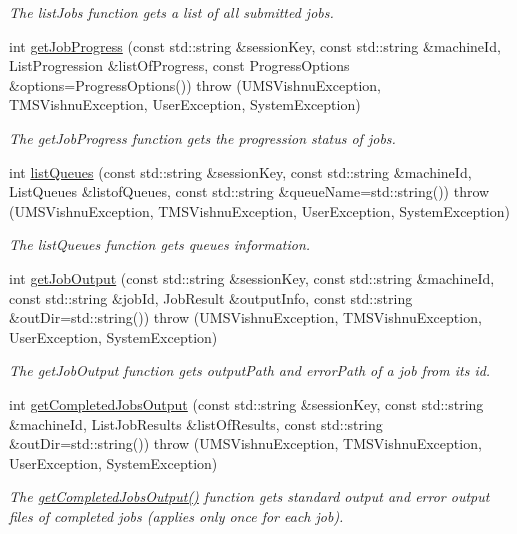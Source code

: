 \begin{DoxyCompactItemize}
\begin{DoxyCompactList}\small\item\em The listJobs function gets a list of all submitted jobs. \item\end{DoxyCompactList}\item 
int \hyperlink{namespacevishnu_a5bc51ba53a335079d0b7044cc2c8f4cc}{getJobProgress} (const std::string \&sessionKey, const std::string \&machineId, ListProgression \&listOfProgress, const ProgressOptions \&options=ProgressOptions())  throw (UMSVishnuException, TMSVishnuException, UserException, SystemException)
\begin{DoxyCompactList}\small\item\em The getJobProgress function gets the progression status of jobs. \item\end{DoxyCompactList}\item 
int \hyperlink{namespacevishnu_ada2d98155cffa475261261fb33f7e873}{listQueues} (const std::string \&sessionKey, const std::string \&machineId, ListQueues \&listofQueues, const std::string \&queueName=std::string())  throw (UMSVishnuException, TMSVishnuException, UserException, SystemException)
\begin{DoxyCompactList}\small\item\em The listQueues function gets queues information. \item\end{DoxyCompactList}\item 
int \hyperlink{namespacevishnu_a6e0b3df33a91bd16cdadf3ac428fcf0e}{getJobOutput} (const std::string \&sessionKey, const std::string \&machineId, const std::string \&jobId, JobResult \&outputInfo, const std::string \&outDir=std::string())  throw (UMSVishnuException, TMSVishnuException, UserException, SystemException)
\begin{DoxyCompactList}\small\item\em The getJobOutput function gets outputPath and errorPath of a job from its id. \item\end{DoxyCompactList}\item 
int \hyperlink{namespacevishnu_aaedc4b5676f0c8e47f333316cff0b0a8}{getCompletedJobsOutput} (const std::string \&sessionKey, const std::string \&machineId, ListJobResults \&listOfResults, const std::string \&outDir=std::string())  throw (UMSVishnuException, TMSVishnuException, UserException, SystemException)
\begin{DoxyCompactList}\small\item\em The \hyperlink{namespacevishnu_aaedc4b5676f0c8e47f333316cff0b0a8}{getCompletedJobsOutput()} function gets standard output and error output files of completed jobs (applies only once for each job). \item\end{DoxyCompactList}\item 

\end{DoxyCompactItemize}
